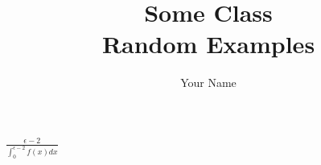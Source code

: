 \documentclass{report}
\title{\Huge{Some Class}\\Random Examples}
\author{\huge{Your Name}}
\date{}
\begin{document}
\newpage
\begin{math}
  \frac{\epsilon -2 }{\int_0^{\epsilon - 2} f(x) dx }
\end{math}
\end{document}
